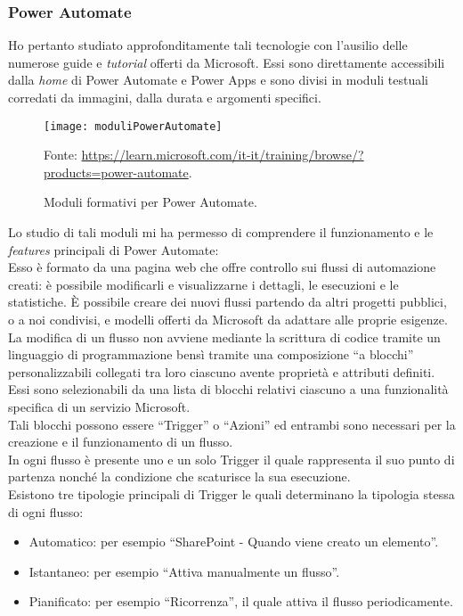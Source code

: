\subsubsection*{Power Automate}
Ho pertanto studiato approfonditamente tali tecnologie con l'ausilio delle numerose guide e \emph{tutorial} offerti da Microsoft. 
Essi sono direttamente accessibili dalla \emph{home} di Power Automate e Power Apps e sono divisi in moduli testuali corredati da immagini, dalla durata e argomenti specifici. 

\begin{figure}[htbp] 
    \centering 
    \texttt{[image: moduliPowerAutomate]} 
    \caption{Moduli formativi per Power Automate.}
    \label{fig:moduliPowerAutomate}
    \vspace{1mm}
    Fonte: \url{https://learn.microsoft.com/it-it/training/browse/?products=power-automate}.
\end{figure}

Lo studio di tali moduli mi ha permesso di comprendere il funzionamento e le \emph{features} principali di Power Automate:\\
Esso è formato da una pagina web che offre controllo sui flussi di automazione creati: è possibile modificarli e visualizzarne i dettagli, le esecuzioni e le statistiche. È possibile creare dei nuovi flussi partendo da altri progetti pubblici, o a noi condivisi, e modelli offerti da Microsoft da adattare alle proprie esigenze.\\
La modifica di un flusso non avviene mediante la scrittura di codice tramite un linguaggio di programmazione bensì tramite una composizione “a blocchi” personalizzabili collegati tra loro ciascuno avente proprietà e attributi definiti.\\
Essi sono selezionabili da una lista di blocchi relativi ciascuno a una funzionalità specifica di un servizio Microsoft.\\
Tali blocchi possono essere “Trigger” o “Azioni” ed entrambi sono necessari per la creazione e il funzionamento di un flusso.\\ 
In ogni flusso è presente uno e un solo Trigger il quale rappresenta il suo punto di partenza nonché la condizione che scaturisce la sua esecuzione.\\
Esistono tre tipologie principali di Trigger le quali determinano la tipologia stessa di ogni flusso:
\begin{itemize}
    \item Automatico: per esempio “SharePoint - Quando viene creato un elemento”. 
    \item Istantaneo: per esempio “Attiva manualmente un flusso”.
    \item Pianificato: per esempio “Ricorrenza”, il quale attiva il flusso periodicamente.\\
\end{itemize}

